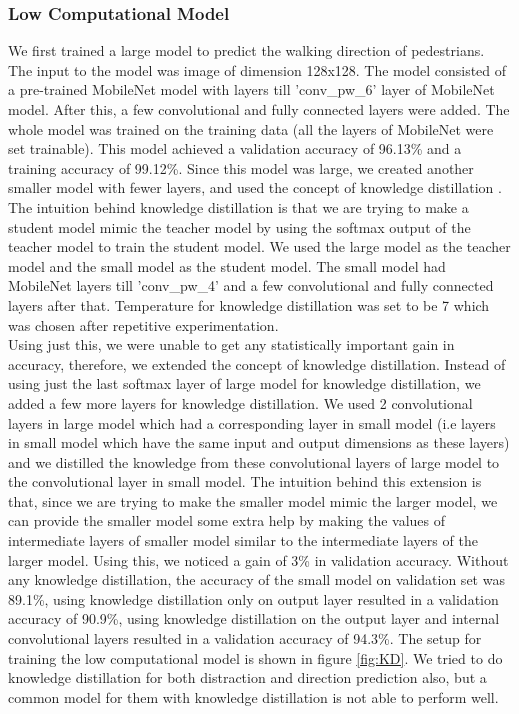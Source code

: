 \documentclass[extendedabs]{bmvc2k}
\begin{document}
\subsubsection{Low Computational Model}
We first trained a large model to predict the walking direction of pedestrians. The input to the model was image of dimension 128x128. The model consisted of a pre-trained MobileNet model with layers till 'conv\_pw\_6' layer of MobileNet model. After this, a few convolutional and fully connected layers were added. The whole model was trained on the training data (all the layers of MobileNet were set trainable). This model achieved a validation accuracy of 96.13\% and a training accuracy of 99.12\%. Since this model was large, we created another smaller model with fewer layers, and used the concept of knowledge distillation \cite{hinton2015distilling}. The intuition behind knowledge distillation is that we are trying to make a student model mimic the teacher model by using the softmax output of the teacher model to train the student model. We used the large model as the teacher model and the small model as the student model. The small model had MobileNet layers till 'conv\_pw\_4' and a few convolutional and fully connected layers after that. Temperature for knowledge distillation was set to be 7 which was chosen after repetitive experimentation.
\\
Using just this, we were unable to get any statistically important gain in accuracy, therefore, we extended the concept of knowledge distillation. Instead of using just the last softmax layer of large model for knowledge distillation, we added a few more layers for knowledge distillation. We used 2 convolutional layers in large model which had a corresponding layer in small model (i.e layers in small model which have the same input and output dimensions as these layers) and we distilled the knowledge from these convolutional layers of large model to the convolutional layer in small model. The intuition behind this extension is that, since we are trying to make the smaller model mimic the larger model, we can provide the smaller model some extra help by making the values of intermediate layers of smaller model similar to the intermediate layers of the larger model. Using this, we noticed a gain of 3\% in validation accuracy. Without any knowledge distillation, the accuracy of the small model on validation set was 89.1\%, using knowledge distillation only on output layer resulted in a validation accuracy of 90.9\%, using knowledge distillation on the output layer and internal convolutional layers resulted in a validation accuracy of 94.3\%. The setup for training the low computational model is shown in figure \ref{fig:KD}. We tried to do knowledge distillation for both distraction and direction prediction also, but a common model for them with knowledge distillation is not able to perform well.
\end{document}
